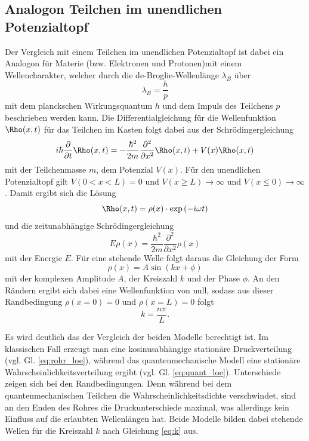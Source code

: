 \subsection{Analogon Teilchen im unendlichen Potenzialtopf}
Der Vergleich mit einem Teilchen im unendlichen Potenzialtopf ist dabei ein Analogon für Materie (bzw. Elektronen und Protonen)mit einem Wellencharakter, welcher durch die de-Broglie-Wellenlänge $\lambda_B$ über
\begin{equation}
    \lambda_B=\frac{h}{p}
\end{equation}
mit dem planckschen Wirkungsquantum $h$ und dem Impuls des Teilchens $p$ beschrieben werden kann.
Die Differentialgleichung für die Wellenfunktion $\Rho(x,t)$ für das Teilchen im Kasten folgt dabei aus der Schrödingergleichung
\begin{equation}
    i\hbar \frac{\partial}{\partial t}\Rho(x,t)=-\frac{\hbar^2}{2m}\frac{\partial^2}{\partial x^2}\Rho(x,t)+V(x)\Rho(x,t)
\end{equation}
mit der Teilchenmasse $m$, dem Potenzial $V(x)$. Für den unendlichen Potenzialtopf gilt $V(0 < x < L)=0$ und
$V(x \geq L)\rightarrow \infty$ und $V(x \leq 0)\rightarrow \infty$.
Damit ergibt sich die Lösung
\begin{equation}
    \Rho(x,t)=\rho(x)\cdot \exp{(-i\omega t)}
\end{equation}
und die zeitunabhängige Schrödingergleichung
\begin{equation}
    E\rho(x)=\frac{\hbar^2}{2m}\frac{\partial^2}{\partial x^2}\rho(x)
\end{equation}
mit der Energie $E$.
Für eine stehende Welle folgt daraus die Gleichung der Form
\begin{equation}
    \rho(x)=A\sin{(kx+\phi)}
    \label{eq:quant_loe}
\end{equation}
mit der komplexen Amplitude $A$, der Kreiszahl $k$ und der Phase $\phi$.
An den Rändern ergibt sich dabei eine Wellenfunktion von null, sodass aus dieser Randbedingung
$\rho(x=0)=0$ und $\rho(x=L)=0$ folgt
\begin{equation}
    k=\frac{n\pi}{L}.
    \label{eq:k}
\end{equation} 

Es wird deutlich das der Vergleich der beiden Modelle berechtigt ist. Im klassischen Fall erzeugt man eine kosinusabhängige stationäre
Druckverteilung (vgl. Gl. \ref{eq:rohr_loe}), während das quantenmechanische Modell 
eine stationäre Wahrscheinlichkeitsverteilung ergibt (vgl. Gl. \ref{eq:quant_loe}). Unterschiede zeigen sich bei den Randbedingungen.
Denn während bei dem quantenmechanischen Teilchen die Wahrscheinlichkeitsdichte verschwindet, sind an den Enden des Rohres 
die Druckunterschiede maximal, was allerdings kein Einfluss auf die erlaubten Wellenlängen hat.
Beide Modelle bilden dabei stehende Wellen für die Kreiszahl $k$ nach Gleichung \ref{eq:k} aus.


